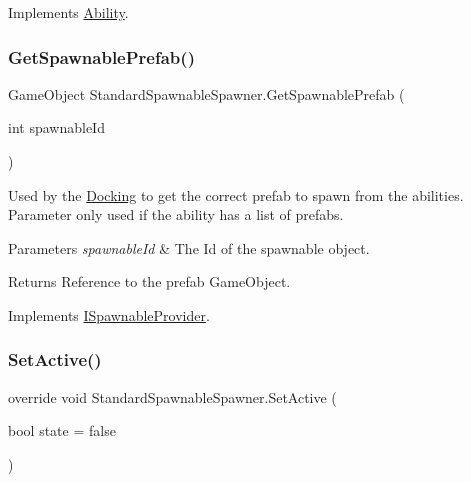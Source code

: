 Implements \hyperlink{class_ability_a7722265862f8b29828315725415ce266}{Ability}.

\hypertarget{class_standard_spawnable_spawner_afaadd0fd0cb2d16b40f979249747e9b1}{}\label{class_standard_spawnable_spawner_afaadd0fd0cb2d16b40f979249747e9b1} 
\subsubsection{\texorpdfstring{Get\+Spawnable\+Prefab()}{GetSpawnablePrefab()}}
{\footnotesize\ttfamily Game\+Object Standard\+Spawnable\+Spawner.\+Get\+Spawnable\+Prefab (\begin{DoxyParamCaption}\item[{int}]{spawnable\+Id }\end{DoxyParamCaption})}



Used by the \hyperlink{class_docking}{Docking} to get the correct prefab to spawn from the abilities. Parameter only used if the ability has a list of prefabs. 


\begin{DoxyParams}{Parameters}
{\em spawnable\+Id} & The Id of the spawnable object.\\
\hline
\end{DoxyParams}
\begin{DoxyReturn}{Returns}
Reference to the prefab Game\+Object.
\end{DoxyReturn}


Implements \hyperlink{interface_i_spawnable_provider_a42e8d986066b6c2e736e1f909f422dc9}{I\+Spawnable\+Provider}.

\hypertarget{class_standard_spawnable_spawner_a1c26d78c619871c3edb8d3febeb16e5f}{}\label{class_standard_spawnable_spawner_a1c26d78c619871c3edb8d3febeb16e5f} 
\subsubsection{\texorpdfstring{Set\+Active()}{SetActive()}}
{\footnotesize\ttfamily override void Standard\+Spawnable\+Spawner.\+Set\+Active (\begin{DoxyParamCaption}\item[{bool}]{state = {\ttfamily false} }\end{DoxyParamCaption})\hspace{0.3cm}{\ttfamily [virtual]}}



